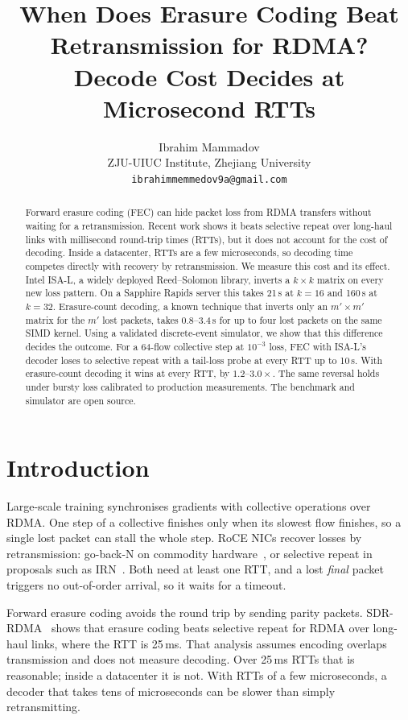 \documentclass[10pt,twocolumn]{article}
\title{When Does Erasure Coding Beat Retransmission for RDMA?\\
\large Decode Cost Decides at Microsecond RTTs}
\author{Ibrahim Mammadov\\
ZJU-UIUC Institute, Zhejiang University\\
\texttt{ibrahimmemmedov9a@gmail.com}}
\date{}
\begin{document}
\maketitle

\begin{abstract}
Forward erasure coding (FEC) can hide packet loss from RDMA transfers without waiting for a
retransmission. Recent work shows it beats selective repeat over long-haul links with millisecond
round-trip times (RTTs), but it does not account for the cost of decoding. Inside a datacenter,
RTTs are a few microseconds, so decoding time competes directly with recovery by retransmission.
We measure this cost and its effect. Intel ISA-L, a widely deployed Reed--Solomon library, inverts
a $k\times k$ matrix on every new loss pattern. On a Sapphire Rapids server this takes 21\,\textmu s
at $k{=}16$ and 160\,\textmu s at $k{=}32$. Erasure-count decoding, a known technique that inverts
only an $m'\times m'$ matrix for the $m'$ lost packets, takes 0.8--3.4\,\textmu s for up to four lost packets on the same SIMD
kernel. Using a validated discrete-event simulator, we show that this difference decides the
outcome. For a 64-flow collective step at $10^{-3}$ loss, FEC with ISA-L's decoder loses to
selective repeat with a tail-loss probe at every RTT up to 10\,\textmu s. With erasure-count
decoding it wins at every RTT, by $1.2$--$3.0\times$. The same reversal holds under bursty loss
calibrated to production measurements. The benchmark and simulator are open source.
\end{abstract}

\section{Introduction}

Large-scale training synchronises gradients with collective operations over RDMA. One step of a
collective finishes only when its slowest flow finishes, so a single lost packet can stall the
whole step. RoCE NICs recover losses by retransmission: go-back-N on commodity
hardware~\cite{rocescale,irn}, or selective repeat in proposals such as IRN~\cite{irn}. Both need
at least one RTT, and a lost \emph{final} packet triggers no out-of-order arrival, so it waits for
a timeout.

Forward erasure coding avoids the round trip by sending parity packets. SDR-RDMA~\cite{sdrrdma}
shows that erasure coding beats selective repeat for RDMA over long-haul links, where the RTT is
25\,ms. That analysis assumes encoding overlaps transmission and does not measure decoding.
Over 25\,ms RTTs that is reasonable; inside a datacenter it is not. With RTTs of a few
microseconds, a decoder that takes tens of microseconds can be slower than simply retransmitting.
\end{document}

